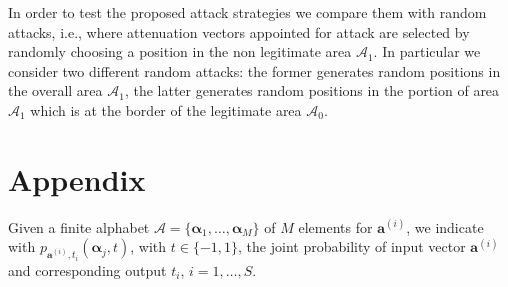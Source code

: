 \documentclass[draftcls,onecolumn,12pt]{IEEEtran}
\begin{document}
In order to test the proposed attack strategies we compare them with random attacks, i.e., where attenuation vectors appointed for attack are selected by randomly choosing a position in the non legitimate area $\mathcal{A}_1$. In particular we consider two different random attacks: the former generates random positions in the overall area $\mathcal{A}_1$, the latter generates random positions in the portion of area $\mathcal{A}_1$ which is at the border of the legitimate area $\mathcal{A}_0$. 

\section*{Appendix}

	Given a finite alphabet $\mathcal A = \{\bm{\alpha}_1, \ldots, \bm{\alpha}_M\}$ of $M$ elements for $\bm{a}^{(i)}$, we indicate with $p_{\bm{a}^{(i)},t_i}(\bm{\alpha}_j, t)$, with $t \in \{-1,1\}$, the joint probability of input vector $\bm{a}^{(i)}$ and corresponding output $t_i$, $i=1, \ldots, S$.
	
\end{document}
